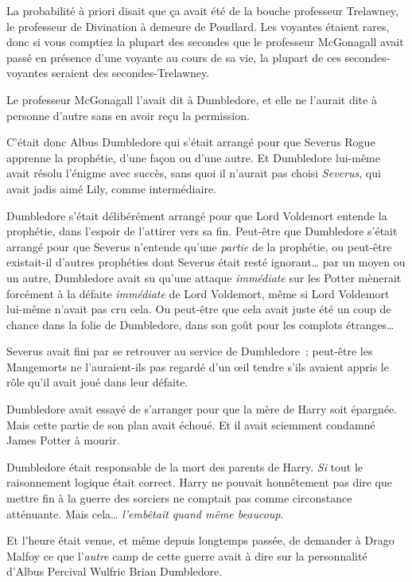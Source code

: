 La probabilité à priori disait que ça avait été de la bouche professeur Trelawney, le professeur de Divination à demeure de Poudlard.
Les voyantes étaient rares, donc si vous comptiez la plupart des secondes que le professeur McGonagall avait passé en présence d'une voyante au cours de sa vie, la plupart de ces secondes-voyantes seraient des secondes-Trelawney.

Le professeur McGonagall l'avait dit à Dumbledore, et elle ne l'aurait dite à personne d'autre sans en avoir reçu la permission.

C'était donc Albus Dumbledore qui s'était arrangé pour que Severus Rogue apprenne la prophétie, d'une façon ou d'une autre.
Et Dumbledore lui-même avait résolu l'énigme avec succès, sans quoi il n'aurait pas choisi \emph{Severus}, qui avait jadis aimé Lily, comme intermédiaire.

Dumbledore s'était délibérément arrangé pour que Lord Voldemort entende la prophétie, dans l'espoir de l'attirer vers sa fin.
Peut-être que Dumbledore s'était arrangé pour que Severus n'entende qu'une \emph{partie} de la prophétie, ou peut-être existait-il d'autres prophéties dont Severus était resté ignorant… par un moyen ou un autre, Dumbledore avait su qu'une attaque \emph{immédiate} sur les Potter mènerait forcément à la défaite \emph{immédiate} de Lord Voldemort, même si Lord Voldemort lui-même n'avait pas cru cela.
Ou peut-être que cela avait juste été un coup de chance dans la folie de Dumbledore, dans son goût pour les complots étranges…

Severus avait fini par se retrouver au service de Dumbledore~; peut-être les Mangemorts ne l'auraient-ils pas regardé d'un œil tendre s'ils avaient appris le rôle qu'il avait joué dans leur défaite.

Dumbledore avait essayé de s'arranger pour que la mère de Harry soit épargnée.
Mais cette partie de son plan avait échoué.
Et il avait sciemment condamné James Potter à mourir.

Dumbledore était responsable de la mort des parents de Harry.
\emph{Si} tout le raisonnement logique était correct.
Harry ne pouvait honnêtement pas dire que mettre fin à la guerre des sorciers ne comptait pas comme circonstance atténuante.
Mais cela…
\emph{l'embêtait quand même beaucoup}.

Et l'heure était venue, et même depuis longtemps passée, de demander à Drago Malfoy ce que l'\emph{autre} camp de cette guerre avait à dire sur la personnalité d'Albus Percival Wulfric Brian Dumbledore.

